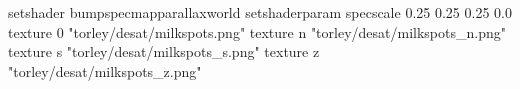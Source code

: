 setshader bumpspecmapparallaxworld
setshaderparam specscale 0.25 0.25 0.25 0.0
texture 0 "torley/desat/milkspots.png"
texture n "torley/desat/milkspots_n.png"
texture s "torley/desat/milkspots_s.png"
texture z "torley/desat/milkspots_z.png"

